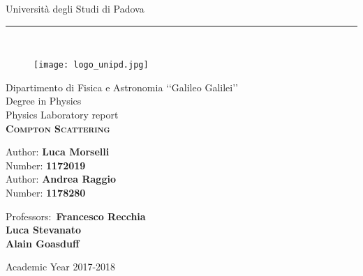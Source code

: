\begin{titlepage}
	
	\begin{center}
		\LARGE{Università degli Studi di Padova}\\
		\noindent\rule{12cm}{0.4pt}\\
		\begin{figure}[H]
			\centering
			\texttt{[image: logo\_unipd.jpg]}
		\end{figure}
		\vspace{-0.2em}
		\Large{Dipartimento di Fisica e Astronomia ‘‘Galileo Galilei’’}\\
		\vspace{2em}
		\Large{Degree in Physics}\\
		\vspace{2em}
		\normalsize{Physics Laboratory report}\\
		\vspace{3.5em}
		\LARGE{\textsc{\textbf{Compton Scattering}}}\\
		\vspace{3em}
		\begin{flushleft}
			\Large{Author: \textbf{Luca Morselli}}\\
			\Large{Number: \textbf{1172019}}\\
			\vspace{0.5em}
			\Large{Author: \textbf{Andrea Raggio}}\\
			\Large{Number: \textbf{1178280}}
		\end{flushleft}
		\vspace{2em}
	\end{center}
	\begin{flushright}
		\normalsize{Professors:~\textbf{Francesco Recchia\\Luca Stevanato\\ Alain Goasduff \\}}
	\end{flushright}
	\begin{center}
		\vspace{2.5em}
		\LARGE{Academic Year 2017-2018}\\
	\end{center}
	
\end{titlepage}